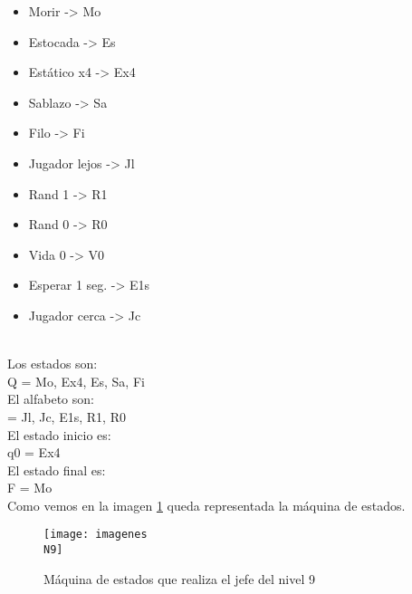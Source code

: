 \begin{itemize}
	\item Morir -> Mo
	\item Estocada -> Es
	\item Estático x4 -> Ex4 
	\item Sablazo -> Sa
	\item Filo -> Fi
	\item Jugador lejos -> Jl
	\item Rand 1 -> R1
	\item Rand 0 -> R0
	\item Vida 0 -> V0
	\item Esperar 1 seg. -> E1s
	\item Jugador cerca -> Jc
\end{itemize}
\\[1pt]

Los estados son:
\\[1pt]
Q = {Mo, Ex4, Es, Sa, Fi}
\\[1pt]

El alfabeto son:
\\[1pt]
\sigma = {Jl, Jc, E1s, R1, R0}
\\[1pt]

El estado inicio es:
\\[1pt]
q0 = {Ex4}
\\[1pt]

El estado final es:
\\[1pt]
F = {Mo}
\\[1pt]


Como vemos en la imagen \ref{fig:maqN9} queda representada la máquina de estados.
\begin{figure}
	\centering
	\caption{Máquina de estados que realiza el jefe del nivel 9}
	\label{fig:maqN9}
	\texttt{[image: imagenes\\N9]}
\end{figure}